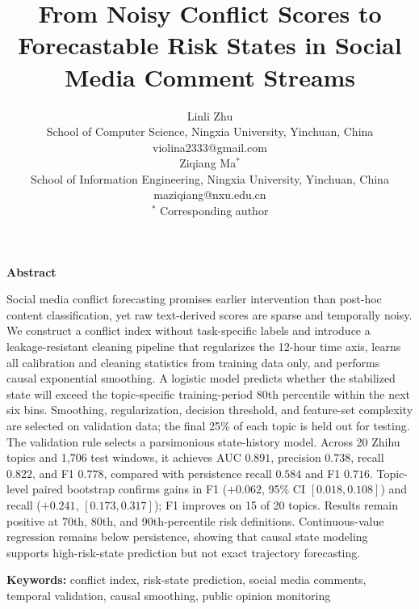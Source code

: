 \documentclass[11pt,a4paper]{article}
\begin{document}
\title{\LARGE\bfseries From Noisy Conflict Scores to Forecastable Risk States in Social Media Comment Streams}

\author{
Linli Zhu\\[2pt]
{\small School of Computer Science, Ningxia University, Yinchuan, China}\\[2pt]
{\small violina2333@gmail.com}\\[6pt]
Ziqiang Ma$^\ast$\\[2pt]
{\small School of Information Engineering, Ningxia University, Yinchuan, China}\\[2pt]
{\small maziqiang@nxu.edu.cn}\\[6pt]
$^\ast$ Corresponding author
}
\date{}

\maketitle

\noindent\textbf{Abstract}

Social media conflict forecasting promises earlier intervention than post-hoc content classification, yet raw text-derived scores are sparse and temporally noisy. We construct a conflict index without task-specific labels and introduce a leakage-resistant cleaning pipeline that regularizes the 12-hour time axis, learns all calibration and cleaning statistics from training data only, and performs causal exponential smoothing. A logistic model predicts whether the stabilized state will exceed the topic-specific training-period 80th percentile within the next six bins. Smoothing, regularization, decision threshold, and feature-set complexity are selected on validation data; the final 25\% of each topic is held out for testing. The validation rule selects a parsimonious state-history model. Across 20 Zhihu topics and 1,706 test windows, it achieves AUC $0.891$, precision $0.738$, recall $0.822$, and F1 $0.778$, compared with persistence recall $0.584$ and F1 $0.716$. Topic-level paired bootstrap confirms gains in F1 ($+0.062$, 95\% CI $[0.018,0.108]$) and recall ($+0.241$, $[0.173,0.317]$); F1 improves on 15 of 20 topics. Results remain positive at 70th, 80th, and 90th-percentile risk definitions. Continuous-value regression remains below persistence, showing that causal state modeling supports high-risk-state prediction but not exact trajectory forecasting.

\noindent\textbf{Keywords:} conflict index, risk-state prediction, social media comments, temporal validation, causal smoothing, public opinion monitoring
\end{document}
